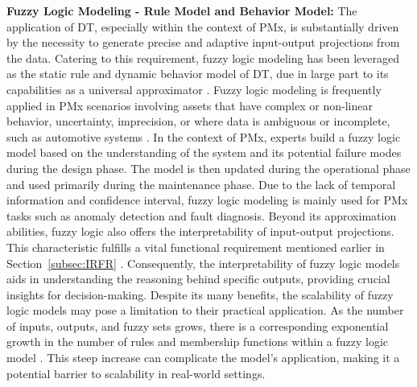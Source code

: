 \documentclass[runningheads]{llncs}
\begin{document}
\textbf{Fuzzy Logic Modeling - Rule Model and Behavior Model:} The application of DT, especially within the context of PMx, is substantially driven by the necessity to generate precise and adaptive input-output projections from the data. Catering to this requirement, fuzzy logic modeling has been leveraged as the static rule and dynamic behavior model of DT, due in large part to its capabilities as a universal approximator \cite{alves2021digital}. Fuzzy logic modeling is frequently applied in PMx scenarios involving assets that have complex or non-linear behavior, uncertainty, imprecision, or where data is ambiguous or incomplete, such as automotive systems \cite{venkatesan2019health}. In the context of PMx, experts build a fuzzy logic model based on the understanding of the system and its potential failure modes during the design phase. The model is then updated during the operational phase and used primarily during the maintenance phase. Due to the lack of temporal information and confidence interval, fuzzy logic modeling is mainly used for PMx tasks such as anomaly detection and fault diagnosis. Beyond its approximation abilities, fuzzy logic also offers the interpretability of input-output projections. This characteristic fulfills a vital functional requirement mentioned earlier in Section~\ref{subsec:IRFR} \cite{ANTONELLI2016649}. Consequently, the interpretability of fuzzy logic models aids in understanding the reasoning behind specific outputs, providing crucial insights for decision-making. Despite its many benefits, the scalability of fuzzy logic models may pose a limitation to their practical application. As the number of inputs, outputs, and fuzzy sets grows, there is a corresponding exponential growth in the number of rules and membership functions within a fuzzy logic model \cite{alves2021digital}. This steep increase can complicate the model's application, making it a potential barrier to scalability in real-world settings.\\
\end{document}
